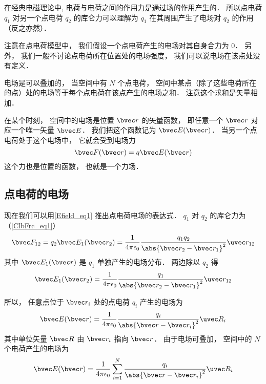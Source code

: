 
在经典电磁理论中, 电荷与电荷之间的作用力是通过场的作用产生的． 所以点电荷 $q_1$ 对另一个点电荷 $q_2$ 的库仑力可以理解为 $q_1$ 在其周围产生了电场对 $q_2$ 的作用（反之亦然）．

注意在点电荷模型中， 我们假设一个点电荷产生的电场对其自身合力为 0． 另外， 我们一般不讨论点电荷所在位置处的电场强度， 我们可以说电场在该点处没有定义．

电场是可以叠加的， 当空间中有 $N$ 个点电荷， 空间中某点（除了这些电荷所在的点）处的电场等于每个点电荷在该点产生的电场之和． 注意这个求和是矢量相加．

在某个时刻， 空间中的电场是位置 $\bvec r$ 的矢量函数， 即任意一个 $\bvec r$ 对应一个唯一矢量 $\bvec E$． 我们把这个函数记为 $\bvec E(\bvec r)$． 当另一个点电荷处于这个电场中， 它就会受到电场力
\begin{equation}\label{Efield_eq1}
\bvec F(\bvec r) = q \bvec E(\bvec r)
\end{equation}
这个力也是位置的函数， 也就是一个力场．
 
\subsection{点电荷的电场}
现在我们可以用\autoref{Efield_eq1} 推出点电荷电场的表达式． $q_1$ 对 $q_2$ 的库仑力为（\autoref{ClbFrc_eq1}）
\begin{equation}\label{Efield_eq3}
\bvec F_{12} = q_2 \bvec E_1(\bvec r_2) = \frac{1}{4\pi\epsilon_0}\frac{q_1 q_2}{\abs{\bvec r_2 - \bvec r_1}^2} \uvec r_{12}
\end{equation}
其中 $\bvec E_1(\bvec r)$ 是 $q_1$ 单独产生的电场分布． 两边除以 $q_2$ 得
\begin{equation}
\bvec E_1(\bvec r_2) = \frac{1}{4\pi\epsilon_0}\frac{q_1}{\abs{\bvec r_2 - \bvec r_1}^2} \uvec r_{12}
\end{equation}

所以， 任意点位于 $\bvec r_i$ 处的点电荷 $q_i$ 产生的电场为
\begin{equation}\label{Efield_eq4}
\bvec E(\bvec r) = \frac{1}{4\pi\epsilon_0}\frac{q_i}{\abs{\bvec r - \bvec r_i}^2} \uvec R_i
\end{equation}
其中单位矢量 $\bvec R$ 由 $\bvec r_i$ 指向 $\bvec r$． 由于电场可叠加， 空间中的 $N$ 个电荷产生的电场为
\begin{equation}\label{Efield_eq2}
\bvec E(\bvec r) = \frac{1}{4\pi\epsilon_0} \sum_{i=1}^N \frac{q_i}{\abs{\bvec r - \bvec r_i}^2} \uvec R_i
\end{equation}

